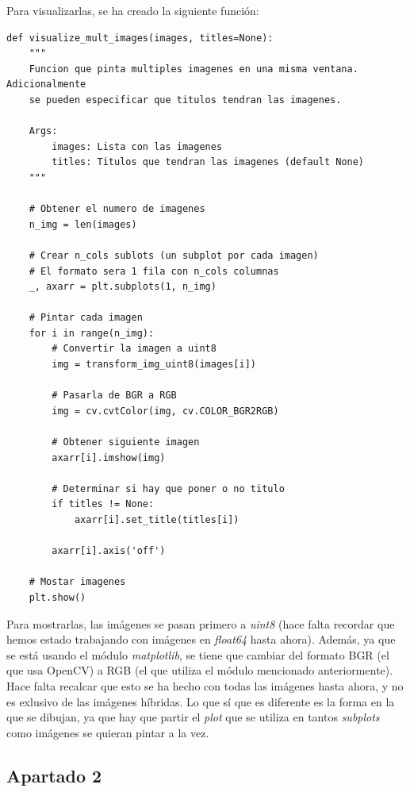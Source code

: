 \documentclass[11pt,a4paper]{article}
\begin{document}
Para visualizarlas, se ha creado la siguiente función:

\begin{lstlisting}[caption={Función que muestra múltiples imágenes en la misma ventana.},label={alg:vis-mult}]
def visualize_mult_images(images, titles=None):
    """
    Funcion que pinta multiples imagenes en una misma ventana. Adicionalmente
    se pueden especificar que titulos tendran las imagenes.

    Args:
        images: Lista con las imagenes
        titles: Titulos que tendran las imagenes (default None)
    """

    # Obtener el numero de imagenes
    n_img = len(images)

    # Crear n_cols sublots (un subplot por cada imagen)
    # El formato sera 1 fila con n_cols columnas
    _, axarr = plt.subplots(1, n_img)

    # Pintar cada imagen
    for i in range(n_img):
        # Convertir la imagen a uint8
        img = transform_img_uint8(images[i])

        # Pasarla de BGR a RGB
        img = cv.cvtColor(img, cv.COLOR_BGR2RGB)

        # Obtener siguiente imagen
        axarr[i].imshow(img)

        # Determinar si hay que poner o no titulo
        if titles != None:
            axarr[i].set_title(titles[i])

        axarr[i].axis('off')

    # Mostar imagenes
    plt.show()
\end{lstlisting}

Para mostrarlas, las imágenes se pasan primero a \textit{uint8} (hace falta recordar que hemos estado trabajando con
imágenes en \textit{float64} hasta ahora). Además, ya que se está usando el módulo \textit{matplotlib}, se tiene
que cambiar del formato BGR (el que usa OpenCV) a RGB (el que utiliza el módulo mencionado anteriormente). Hace falta recalcar
que esto se ha hecho con todas las imágenes hasta ahora, y no es exlusivo de las imágenes híbridas. Lo que sí que es
diferente es la forma en la que se dibujan, ya que hay que partir el \textit{plot} que se utiliza en tantos
\textit{subplots} como imágenes se quieran pintar a la vez.

\subsection{Apartado 2}
\end{document}
